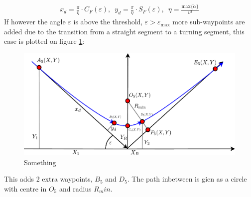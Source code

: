 \documentclass[a0,portrait]{a0poster}
\begin{document}
\begin{center}
{\begin{align}
x_d = \frac{\pi}{\eta}\cdot C_F(\varepsilon),\,\,\, y_d = \frac{\pi}{\eta}\cdot S_F(\varepsilon),\,\,\, \eta = \frac{\text{max}\{\dot{\alpha}\}}{v^2}
\end{align}
If however the angle $\varepsilon$ is above the threshold, $\varepsilon > \varepsilon_\text{max}$ more sub-waypoints are added due to the transition from a straight segment to a turning segment, this case is plotted on figure \ref{fig:5points}:
\begin{figure}
	\centering %
	\includegraphics[width=\threecolwidth]{img/5points}
  	\caption{Something}
	\label{fig:5points}
\end{figure}
This adds 2 extra waypoints, $B_5$ and $D_5$. The path inbetween is gien as a circle with centre in $O_5$ and radius $R_min$.  


}
\col{
}
\end{center}
\end{document}
